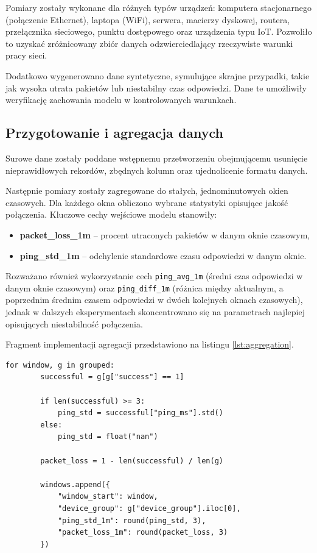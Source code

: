 Pomiary zostały wykonane dla różnych typów urządzeń: komputera stacjonarnego (połączenie Ethernet), laptopa (WiFi), serwera, macierzy dyskowej, routera, przełącznika sieciowego, punktu dostępowego oraz urządzenia typu IoT. Pozwoliło to uzyskać zróżnicowany zbiór danych odzwierciedlający rzeczywiste warunki pracy sieci.

Dodatkowo wygenerowano dane syntetyczne, symulujące skrajne przypadki, takie jak wysoka utrata pakietów lub niestabilny czas odpowiedzi. Dane te umożliwiły weryfikację zachowania modelu w kontrolowanych warunkach.

\subsection{Przygotowanie i agregacja danych}

Surowe dane zostały poddane wstępnemu przetworzeniu obejmującemu usunięcie nieprawidłowych rekordów, zbędnych kolumn oraz ujednolicenie formatu danych. 

Następnie pomiary zostały zagregowane do stałych, jednominutowych okien czasowych. Dla każdego okna obliczono wybrane statystyki opisujące jakość połączenia. Kluczowe cechy wejściowe modelu stanowiły:

\begin{itemize}
	\item \textbf{packet\_loss\_1m} – procent utraconych pakietów w danym oknie czasowym,
	\item \textbf{ping\_std\_1m} – odchylenie standardowe czasu odpowiedzi w danym oknie.
\end{itemize}

Rozważano również wykorzystanie cech \texttt{ping\_avg\_1m} (średni czas odpowiedzi w danym oknie czasowym) oraz \texttt{ping\_diff\_1m} (różnica między aktualnym, a poprzednim średnim czasem odpowiedzi w dwóch kolejnych oknach czasowych), jednak w dalszych eksperymentach skoncentrowano się na parametrach najlepiej opisujących niestabilność połączenia.

Fragment implementacji agregacji przedstawiono na listingu \ref{lst:aggregation}.

\begin{lstlisting}[style=pythonstyle, caption={Agregacja danych do okien czasowych}, label={lst:aggregation}]
	for window, g in grouped:
		successful = g[g["success"] == 1]
	
		if len(successful) >= 3:
			ping_std = successful["ping_ms"].std()
		else:
			ping_std = float("nan")
	
		packet_loss = 1 - len(successful) / len(g)
	
		windows.append({
			"window_start": window,
			"device_group": g["device_group"].iloc[0],
			"ping_std_1m": round(ping_std, 3),
			"packet_loss_1m": round(packet_loss, 3)
		})
\end{lstlisting}

